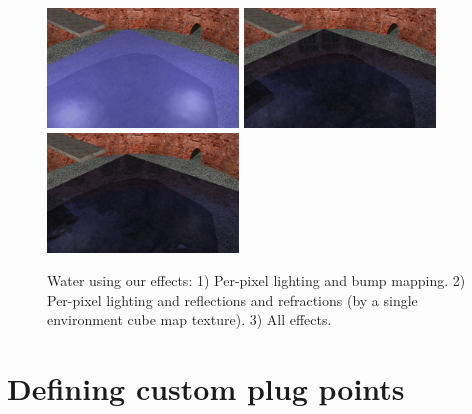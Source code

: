 \documentclass{egpubl}
\begin{document}


\setcounter{figure}{7}
\begin{figure}[b]
  \centering
  \includegraphics[width=2.0in]{water_shaders_1}
  \includegraphics[width=2.0in]{water_shaders_2}
  \includegraphics[width=2.0in]{water_shaders_3}
  \caption{Water using our effects: 1) Per-pixel lighting and bump mapping.
2) Per-pixel lighting and reflections and refractions (by a single environment cube map texture).
3) All effects.}
  \label{fig_water}
\end{figure}
\setcounter{figure}{5}

\section{Defining custom plug points}
\end{document}
